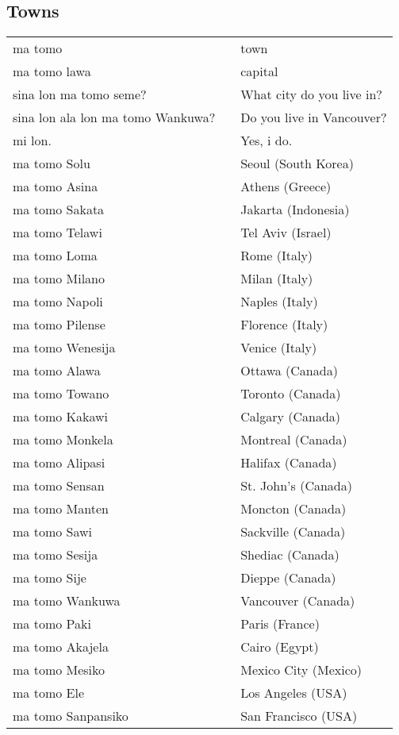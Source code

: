 %
%
\subsection{Towns}
%
\begin{supertabular}{p{4,5cm}|ll}
ma tomo && town \\
ma tomo lawa && capital \\
sina lon ma tomo seme? && What city do you live in? \\
sina lon ala lon ma tomo Wankuwa? && Do you live in Vancouver?  \\
 mi lon. &&  Yes, i do. \\
ma tomo Solu && Seoul (South Korea) \\
ma tomo Asina && Athens (Greece) \\
ma tomo Sakata && Jakarta (Indonesia) \\
ma tomo Telawi && Tel Aviv (Israel) \\
ma tomo Loma && Rome (Italy) \\
ma tomo Milano && Milan (Italy) \\
ma tomo Napoli && Naples (Italy) \\
ma tomo Pilense && Florence (Italy) \\
ma tomo Wenesija && Venice (Italy) \\
ma tomo Alawa && Ottawa (Canada) \\
ma tomo Towano && Toronto (Canada) \\
ma tomo Kakawi && Calgary (Canada) \\
ma tomo Monkela && Montreal (Canada) \\
ma tomo Alipasi && Halifax (Canada) \\
ma tomo Sensan && St. John's (Canada) \\
ma tomo Manten && Moncton (Canada) \\
ma tomo Sawi && Sackville (Canada) \\
ma tomo Sesija && Shediac (Canada) \\
ma tomo Sije && Dieppe (Canada) \\
ma tomo Wankuwa && Vancouver (Canada) \\
ma tomo Paki && Paris (France) \\
ma tomo Akajela && Cairo (Egypt) \\
ma tomo Mesiko && Mexico City (Mexico) \\
ma tomo Ele && Los Angeles (USA) \\
ma tomo Sanpansiko && San Francisco (USA) \\

\end{supertabular}
